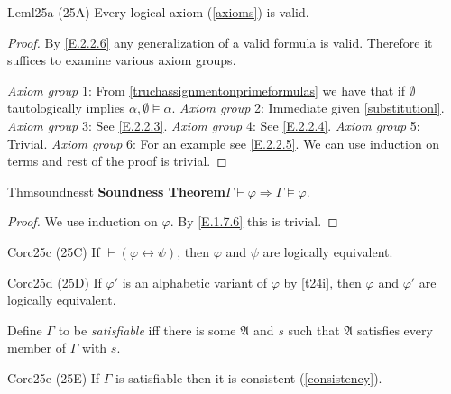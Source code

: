 \begin{reference}{Lem}{l25a}
  (25A) Every logical axiom (\ref{axioms}) is valid.
\end{reference}

\begin{proof}
  By \ref{E.2.2.6} any generalization of a valid formula is valid. Therefore it suffices to examine various axiom groups.

  \textit{Axiom group} 1: From \ref{truchassignmentonprimeformulas} we have that if $\emptyset$ tautologically implies $\alpha,\emptyset\vDash \alpha$.\newline
  \textit{Axiom group} 2: Immediate given \ref{substitutionl}.\newline
  \textit{Axiom group} 3: See \ref{E.2.2.3}.\newline
  \textit{Axiom group} 4: See \ref{E.2.2.4}.\newline
  \textit{Axiom group} 5: Trivial.\newline
  \textit{Axiom group} 6: For an example see \ref{E.2.2.5}. We can use induction on terms and rest of the proof is trivial.
\end{proof}

\begin{reference}{Thm}{soundnesst}
  \textbf{Soundness Theorem}\quad $\Gamma\vdash \varphi\Rightarrow \Gamma\vDash \varphi.$
\end{reference}

\begin{proof}
  We use induction on $\varphi$. By \ref{E.1.7.6} this is trivial.
\end{proof}

\begin{reference}{Cor}{c25c}
  (25C) If $\vdash(\varphi \leftrightarrow \psi)$, then $\varphi$ and $\psi$ are logically equivalent.
\end{reference}

\begin{reference}{Cor}{c25d}
  (25D) If $\varphi'$ is an alphabetic variant of $\varphi$ by \ref{t24i}, then $\varphi$ and $\varphi'$ are logically equivalent.
\end{reference}

Define $\Gamma$ to be \textit{satisfiable} iff there is some $\mathfrak{A}$ and $s$ such that $\mathfrak{A}$ satisfies every member of $\Gamma$ with $s$.

\begin{reference}{Cor}{c25e}
  (25E) If $\Gamma$ is satisfiable then it is consistent (\ref{consistency}).
\end{reference}

